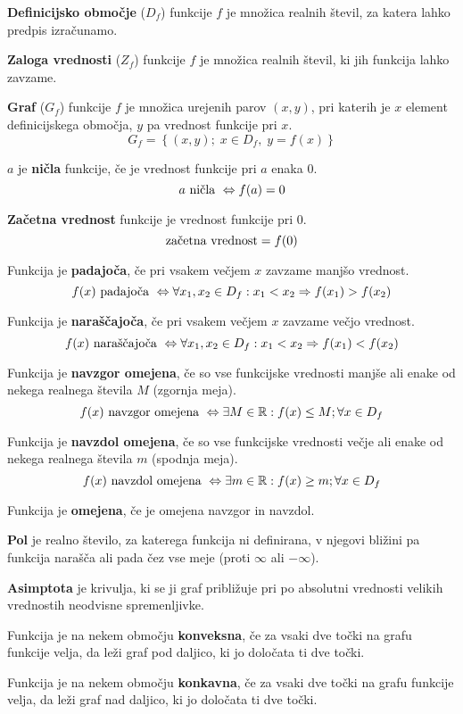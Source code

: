 \documentclass[a4paper,oneside,12pt,fleqn]{article}
\def\R{\ensuremath{\mathbb R}}
\renewcommand\implies\Rightarrow
\renewcommand\iff\Leftrightarrow
\numberwithin{equation}{section}
\begin{document}
\textbf{Definicijsko območje} ($D_f$) funkcije $f$ je množica realnih števil, za katera lahko
predpis izračunamo.

\textbf{Zaloga vrednosti} ($Z_f$) funkcije $f$ je množica realnih števil, ki jih funkcija lahko
zavzame.

\textbf{Graf} ($G_f$) funkcije $f$ je množica urejenih parov $(x, y)$, pri katerih je $x$ element
definicijskega območja, $y$ pa vrednost funkcije pri $x$.
\[ G_f = \left\{ (x,y); \; x \in D_f, \; y = f(x) \right\} \]

$a$ je \textbf{ničla} funkcije, če je vrednost funkcije pri $a$ enaka 0.
\[ a \textnormal{ ničla } \iff f(a) = 0 \]

\textbf{Začetna vrednost} funkcije je vrednost funkcije pri 0.
\[ \textnormal{začetna vrednost} = f(0) \]

Funkcija je \textbf{padajoča}, če pri vsakem večjem $x$ zavzame manjšo vrednost.
\[ f(x) \textnormal{ padajoča } \iff \forall x_1, x_2 \in D_f: x_1 < x_2 \implies f(x_1) >
f(x_2) \]

Funkcija je \textbf{naraščajoča}, če pri vsakem večjem $x$ zavzame večjo vrednost.
\[ f(x) \textnormal{ naraščajoča } \iff \forall x_1, x_2 \in D_f: x_1 < x_2 \implies f(x_1) <
f(x_2) \]

Funkcija je \textbf{navzgor omejena}, če so vse funkcijske vrednosti manjše ali enake od nekega
realnega števila $M$ (zgornja meja).
\[ f(x) \textnormal{ navzgor omejena } \iff \exists M \in \R: f(x) \leq M; \forall x \in D_f \]


Funkcija je \textbf{navzdol omejena}, če so vse funkcijske vrednosti večje ali enake od nekega
realnega števila $m$ (spodnja meja).
\[ f(x) \textnormal{ navzdol omejena } \iff \exists m \in \R: f(x) \geq m; \forall x \in D_f \]

Funkcija je \textbf{omejena}, če je omejena navzgor in navzdol.

\textbf{Pol} je realno število, za katerega funkcija ni definirana, v njegovi bližini pa funkcija
narašča ali pada čez vse meje (proti $\infty$ ali $-\infty$).

\textbf{Asimptota} je krivulja, ki se ji graf približuje pri po absolutni vrednosti velikih
vrednostih neodvisne spremenljivke.

Funkcija je na nekem območju \textbf{konveksna}, če za vsaki dve točki na grafu funkcije
velja, da leži graf pod daljico, ki jo določata ti dve točki.

Funkcija je na nekem območju \textbf{konkavna}, če za vsaki dve točki na grafu funkcije velja, da
leži graf nad daljico, ki jo določata ti dve točki.
\end{document}
